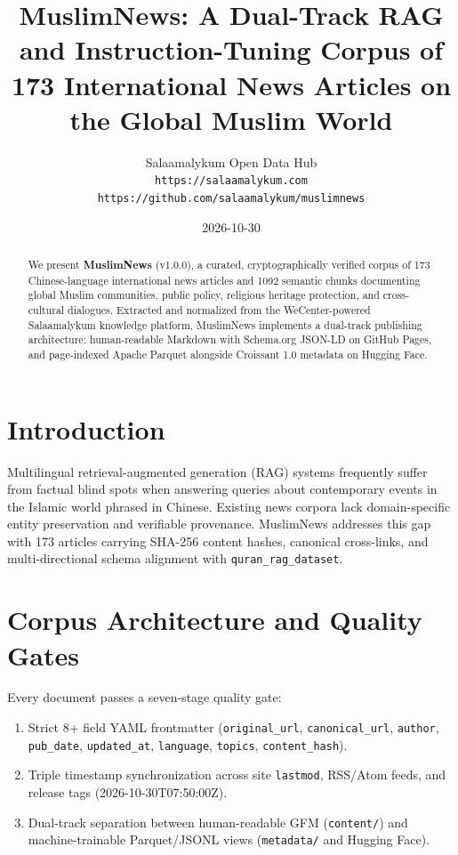 \documentclass[11pt,a4paper]{article}
\title{MuslimNews: A Dual-Track RAG and Instruction-Tuning Corpus of 173 International News Articles on the Global Muslim World}
\author{Salaamalykum Open Data Hub \\
  \texttt{https://salaamalykum.com} \\
  \texttt{https://github.com/salaamalykum/muslimnews}}
\date{2026-10-30}
\begin{document}
\maketitle
\begin{abstract}
We present \textbf{MuslimNews} (v1.0.0), a curated, cryptographically verified corpus of 173 Chinese-language international news articles and 1092 semantic chunks documenting global Muslim communities, public policy, religious heritage protection, and cross-cultural dialogues. Extracted and normalized from the WeCenter-powered Salaamalykum knowledge platform, MuslimNews implements a dual-track publishing architecture: human-readable Markdown with Schema.org JSON-LD on GitHub Pages, and page-indexed Apache Parquet alongside Croissant 1.0 metadata on Hugging Face.
\end{abstract}

\section{Introduction}
Multilingual retrieval-augmented generation (RAG) systems frequently suffer from factual blind spots when answering queries about contemporary events in the Islamic world phrased in Chinese. Existing news corpora lack domain-specific entity preservation and verifiable provenance. MuslimNews addresses this gap with 173 articles carrying SHA-256 content hashes, canonical cross-links, and multi-directional schema alignment with \texttt{quran\_rag\_dataset}.

\section{Corpus Architecture and Quality Gates}
Every document passes a seven-stage quality gate:
\begin{enumerate}
  \item Strict 8+ field YAML frontmatter (\texttt{original\_url}, \texttt{canonical\_url}, \texttt{author}, \texttt{pub\_date}, \texttt{updated\_at}, \texttt{language}, \texttt{topics}, \texttt{content\_hash}).
  \item Triple timestamp synchronization across site \texttt{lastmod}, RSS/Atom feeds, and release tags (2026-10-30T07:50:00Z).
  \item Dual-track separation between human-readable GFM (\texttt{content/}) and machine-trainable Parquet/JSONL views (\texttt{metadata/} and Hugging Face).
\end{enumerate}
\end{document}
